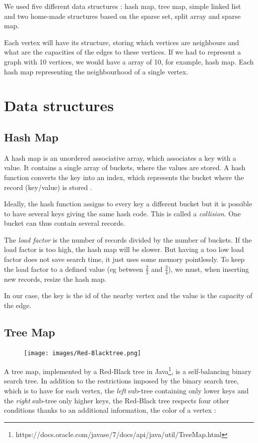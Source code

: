 We used five different data structures : hash map, tree map, simple linked list and two home-made structures based on the sparse set, split array and sparse map. 

Each vertex will have its structure, storing which vertices are neighbours and what are the capacities of the edges to these vertices. If we had to represent a graph with 10 vertices, we would have a array of 10, for example, hash map. Each hash map representing the neighbourhood of a single vertex.

\section{Data structures}
\subsection{Hash Map}
A hash map is an unordered associative array, which associates a key with a value. It contains a single array of buckets, where the values are stored. A hash function converts the key into an index, which represents the bucket where the record (key/value) is stored \cite{datastructures}. \newline

Ideally, the hash function assigns to every key a different bucket but it is possible to have several keys giving the same hash code. This is called a \textit{collision}. One bucket can thus contain several records. \newline

The \textit{load factor} is the number of records divided by the number of buckets.  If the load factor is too high, the hash map will be slower. But having a too low load factor does not save search time, it just uses some memory pointlessly. To keep the load factor to a defined value (eg between $\frac{2}{3}$ and $\frac{3}{4}$), we must, when inserting new records, resize the hash map. \newline

In our case, the key is the id of the nearby vertex and the value is the capacity of the edge.

\subsection{Tree Map}

\begin{figure}
	\vspace{-8mm}
	\texttt{[image: images/Red-Blacktree.png]}
\end{figure}
A tree map, implemented by a Red-Black tree in Java\footnote{https://docs.oracle.com/javase/7/docs/api/java/util/TreeMap.html}, is a self-balancing binary search tree. In addition to the restrictions imposed by the binary search tree, which is to have for each vertex, the \textit{left} sub-tree containing only lower keys and the \textit{right} sub-tree only higher keys, the Red-Black tree respects four other conditions thanks to an additional information, the color of a vertex :

